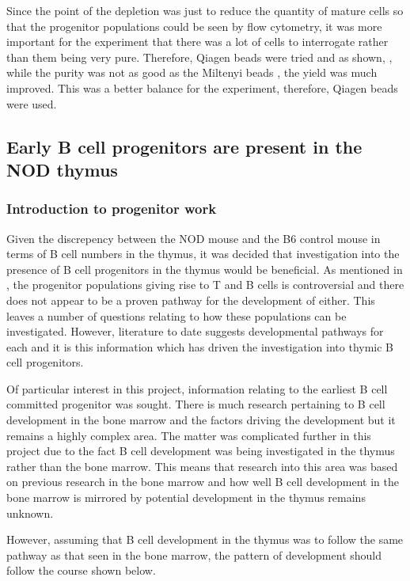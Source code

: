Since the point of the depletion was just to reduce the quantity of mature cells so that the progenitor populations could be seen by flow cytometry, it was more important for the experiment that there was a lot of cells to interrogate rather than them being very pure.
Therefore, Qiagen beads were tried and as shown, , while the purity was not as good as the Miltenyi beads , the yield was much improved.
This was a better balance for the experiment, therefore, Qiagen beads were used.

\subsection{Early B cell progenitors are present in the NOD thymus}

\subsubsection{Introduction to progenitor work}

Given the discrepency between the NOD mouse and the B6 control mouse in terms of B cell numbers in the thymus, it was decided that investigation into the presence of B cell progenitors in the thymus would be beneficial.
As mentioned in , the progenitor populations giving rise to T and B cells is controversial and there does not appear to be a proven pathway for the development of either.
This leaves a number of questions relating to how these populations can be investigated.
However, literature to date suggests developmental pathways for each and it is this information which has driven the investigation into thymic B cell progenitors.

Of particular interest in this project, information relating to the earliest B cell committed progenitor was sought.
There is much research pertaining to B cell development in the bone marrow and the factors driving the development but it remains a highly complex area.
The matter was complicated further in this project due to the fact B cell development was being investigated in the thymus rather than the bone marrow.
This means that research into this area was based on previous research in the bone marrow and how well B cell development in the bone marrow is mirrored by potential development in the thymus remains unknown.

 However, assuming that B cell development in the thymus was to follow the same pathway as that seen in the bone marrow, the pattern of development should follow the course shown below.
 
